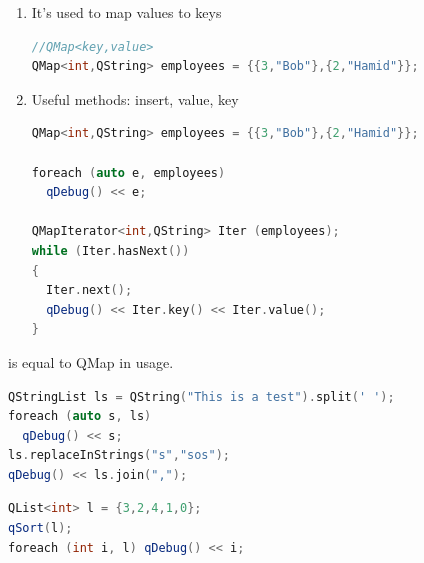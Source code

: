 \begin{note}
\begin{enumerate}
\item It's used to map values to keys
\begin{lstlisting}[language = {c++}]
//QMap<key,value>
QMap<int,QString> employees = {{3,"Bob"},{2,"Hamid"}};
\end{lstlisting}
\item Useful methods: insert, value, key
\begin{lstlisting}[language = {c++}]
QMap<int,QString> employees = {{3,"Bob"},{2,"Hamid"}};

foreach (auto e, employees)
  qDebug() << e;

QMapIterator<int,QString> Iter (employees);
while (Iter.hasNext())
{
  Iter.next();
  qDebug() << Iter.key() << Iter.value();
}
\end{lstlisting}
\end{enumerate}
\end{note}
\begin{note}[QHash ]is equal to QMap in usage.
\end{note}
\begin{note}[QStringList]
\begin{lstlisting}[language = {c++}]
QStringList ls = QString("This is a test").split(' ');
foreach (auto s, ls)
  qDebug() << s;
ls.replaceInStrings("s","sos");
qDebug() << ls.join(",");
\end{lstlisting}
\end{note}

\begin{note}[QSort]
\begin{lstlisting}[language = {c++}]
QList<int> l = {3,2,4,1,0};
qSort(l);
foreach (int i, l) qDebug() << i;
\end{lstlisting}
\end{note}